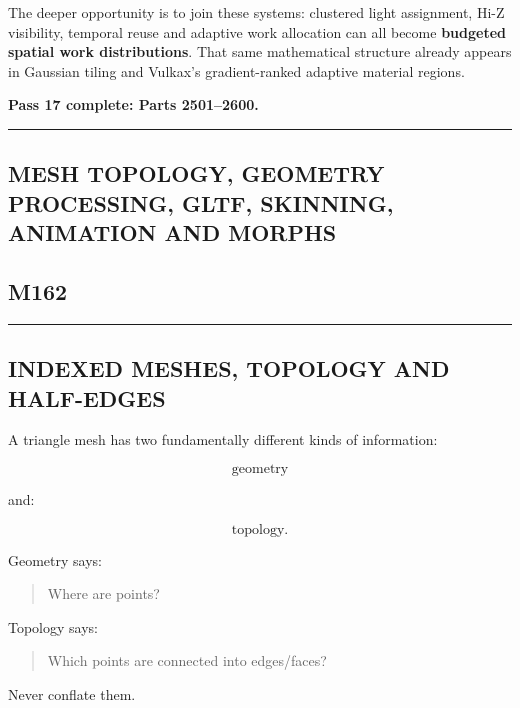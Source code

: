 The deeper opportunity is to join these systems: clustered light assignment, Hi-Z visibility, temporal reuse and adaptive work allocation can all become \textbf{budgeted spatial work distributions}. That same mathematical structure already appears in Gaussian tiling and Vulkax's gradient-ranked adaptive material regions.

\textbf{Pass 17 complete: Parts 2501--2600.}

\begin{center}\rule{0.5\linewidth}{0.5pt}\end{center}

\subsection{MESH TOPOLOGY, GEOMETRY PROCESSING, GLTF, SKINNING, ANIMATION AND MORPHS}\label{04-visual-computing-ii-ch040-mesh-topology-geometry-processing-gltf-skinning-animation-and-morphs}

\subsection{M162}\label{04-visual-computing-ii-ch040-m162}

\begin{center}\rule{0.5\linewidth}{0.5pt}\end{center}

\subsection{INDEXED MESHES, TOPOLOGY AND HALF-EDGES}\label{04-visual-computing-ii-ch040-indexed-meshes-topology-and-half-edges}

A triangle mesh has two fundamentally different kinds of information:

\[
\boxed{
\text{geometry}
}
\]

and:

\[
\boxed{
\text{topology}.
}
\]

Geometry says:

\begin{quote}
Where are points?
\end{quote}

Topology says:

\begin{quote}
Which points are connected into edges/faces?
\end{quote}

Never conflate them.

